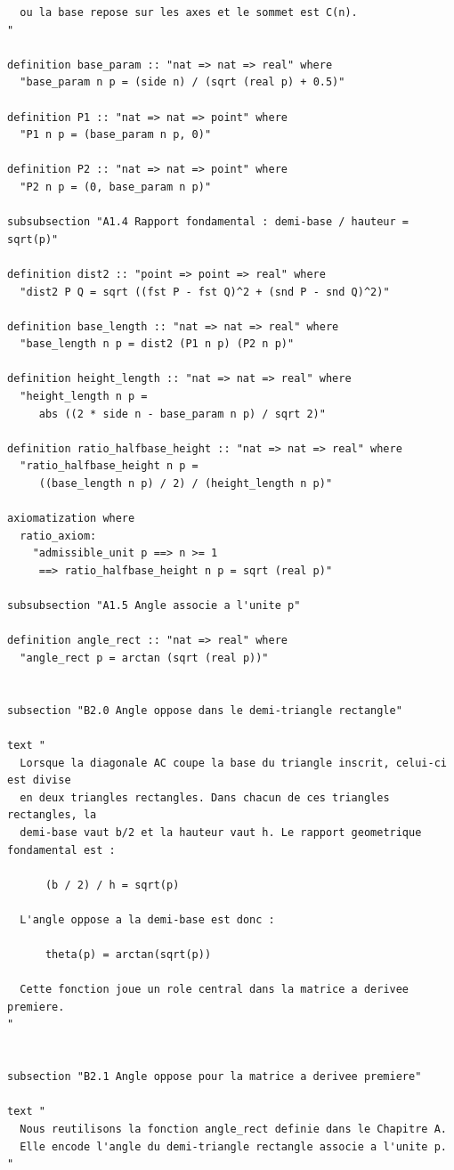\documentclass[12pt,a4paper]{article}
\theoremstyle{definition}
\theoremstyle{remark}
\begin{document}
\begin{verbatim}
  ou la base repose sur les axes et le sommet est C(n).
"

definition base_param :: "nat => nat => real" where
  "base_param n p = (side n) / (sqrt (real p) + 0.5)"

definition P1 :: "nat => nat => point" where
  "P1 n p = (base_param n p, 0)"

definition P2 :: "nat => nat => point" where
  "P2 n p = (0, base_param n p)"

subsubsection "A1.4 Rapport fondamental : demi-base / hauteur = sqrt(p)"

definition dist2 :: "point => point => real" where
  "dist2 P Q = sqrt ((fst P - fst Q)^2 + (snd P - snd Q)^2)"

definition base_length :: "nat => nat => real" where
  "base_length n p = dist2 (P1 n p) (P2 n p)"

definition height_length :: "nat => nat => real" where
  "height_length n p =
     abs ((2 * side n - base_param n p) / sqrt 2)"

definition ratio_halfbase_height :: "nat => nat => real" where
  "ratio_halfbase_height n p =
     ((base_length n p) / 2) / (height_length n p)"

axiomatization where
  ratio_axiom:
    "admissible_unit p ==> n >= 1
     ==> ratio_halfbase_height n p = sqrt (real p)"

subsubsection "A1.5 Angle associe a l'unite p"

definition angle_rect :: "nat => real" where
  "angle_rect p = arctan (sqrt (real p))"


subsection "B2.0 Angle oppose dans le demi-triangle rectangle"

text "
  Lorsque la diagonale AC coupe la base du triangle inscrit, celui-ci est divise
  en deux triangles rectangles. Dans chacun de ces triangles rectangles, la
  demi-base vaut b/2 et la hauteur vaut h. Le rapport geometrique fondamental est :

      (b / 2) / h = sqrt(p)

  L'angle oppose a la demi-base est donc :

      theta(p) = arctan(sqrt(p))

  Cette fonction joue un role central dans la matrice a derivee premiere.
"


subsection "B2.1 Angle oppose pour la matrice a derivee premiere"

text "
  Nous reutilisons la fonction angle_rect definie dans le Chapitre A.
  Elle encode l'angle du demi-triangle rectangle associe a l'unite p.
"


\end{verbatim}
\end{document}
